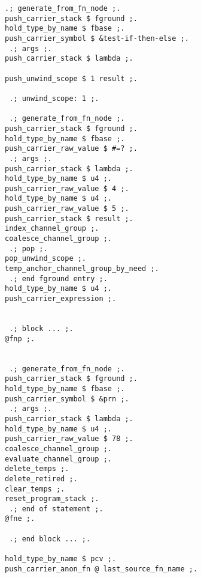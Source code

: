 \begin{lstlisting}[caption={%
\emblink{\#lst--ifte--\thelstlisting.pgvm-pdf}{Intermediate Representation with  
  Deferred Evaluation}},
  numbers = none, escapechar = !,label={lst:ifte},
    basicstyle = \ttfamily\bfseries\footnotesize, linewidth = \linewidth]
 .; generate_from_fn_node ;.
push_carrier_stack $ fground ;.
hold_type_by_name $ fbase ;.
push_carrier_symbol $ &test-if-then-else ;.
 .; args ;.
push_carrier_stack $ lambda ;.

push_unwind_scope $ 1 result ;.

 .; unwind_scope: 1 ;.

 .; generate_from_fn_node ;.
push_carrier_stack $ fground ;.
hold_type_by_name $ fbase ;.
push_carrier_raw_value $ #=? ;.
 .; args ;.
push_carrier_stack $ lambda ;.
hold_type_by_name $ u4 ;.
push_carrier_raw_value $ 4 ;.
hold_type_by_name $ u4 ;.
push_carrier_raw_value $ 5 ;.
push_carrier_stack $ result ;.
index_channel_group ;.
coalesce_channel_group ;.
 .; pop ;.
pop_unwind_scope ;.
temp_anchor_channel_group_by_need ;.
 .; end fground entry ;.
hold_type_by_name $ u4 ;.
push_carrier_expression ;.


 .; block ... ;.
@fnp ;.


 .; generate_from_fn_node ;.
push_carrier_stack $ fground ;.
hold_type_by_name $ fbase ;.
push_carrier_symbol $ &prn ;.
 .; args ;.
push_carrier_stack $ lambda ;.
hold_type_by_name $ u4 ;.
push_carrier_raw_value $ 78 ;.
coalesce_channel_group ;.
evaluate_channel_group ;.
delete_temps ;.
delete_retired ;.
clear_temps ;.
reset_program_stack ;.
 .; end of statement ;.
@fne ;.

 .; end block ... ;.

hold_type_by_name $ pcv ;.
push_carrier_anon_fn @ last_source_fn_name ;.

\end{lstlisting}

\vspace{-2em}

